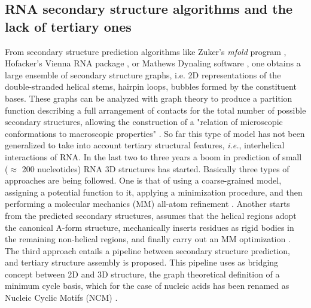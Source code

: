 \subsection{RNA  secondary  structure   algorithms  and  the  lack  of
 tertiary ones}
From   secondary   structure   prediction  algorithms   like   Zuker's
\textit{mfold} program \cite{zuker2003}, Hofacker's Vienna RNA package
\cite{hofacker1994}, or  Mathews Dynaling software \cite{mathews2002},
one obtains  a large ensemble  of secondary structure graphs,  i.e. 2D
representations of  the double-stranded helical  stems, hairpin loops,
bubbles formed by the constituent bases.  These graphs can be analyzed
with graph  theory to produce  a partition function describing  a full
arrangement  of contacts for  the total  number of  possible secondary
structures, allowing  the construction  of a "relation  of microscopic
conformations to macroscopic  properties" \cite{chen2000}. So far this
type of model  has not been generalized to  take into account tertiary
structural features, \textit{i.e.},  interhelical interactions of RNA.
In  the  last  two to  three  years  a  boom  in prediction  of  small
($\approx$ 200  nucleotides) RNA 3D structures  has started. Basically
three types of approaches are being  followed.  One is that of using a
coarse-grained model, assigning a potential function to it, applying a
minimization procedure, and then performing a molecular mechanics (MM)
all-atom  refinement \cite{das2007,  ding2008,  jonikas2009a}. Another
starts  from  the predicted  secondary  structures,  assumes that  the
helical  regions adopt  the canonical  A-form  structure, mechanically
inserts residues as rigid bodies in the remaining non-helical regions,
and  finally carry  out an  MM optimization  \cite{martinez2008}.  The
third  approach   entails  a  pipeline   between  secondary  structure
prediction, and tertiary structure assembly is proposed. This pipeline
uses  as bridging  concept  between  2D and  3D  structure, the  graph
theoretical definition of a minimum cycle basis, which for the case of
nucleic  acids  has  been  renamed  as  Nucleic  Cyclic  Motifs  (NCM)
\cite{parisien2008}.

